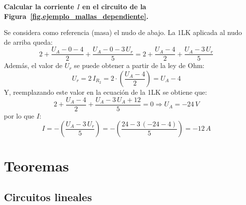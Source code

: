 	\begin{example}\label{ex.nudos_mod_fdep}
	    \textbf{Calcular la corriente $I$ en el circuito de la Figura~\ref{fig.ejemplo_mallas_dependiente}.}
	    
	    Se considera como referencia (masa) el nudo de abajo. La 1LK aplicada al nudo de arriba queda: 
	    \begin{equation*}
	        2+\dfrac{U_A-0-4}{2}+\dfrac{U_A-0-3\,U_r}{5}=2+\dfrac{U_A-4}{2}+\dfrac{U_A-3\,U_r}{5}
	    \end{equation*}
	    Además, el valor de $U_r$ se puede obtener a partir de la ley de Ohm:
	    \begin{equation*}
	        U_r=2\, I_{R_2}=2\cdot \left( \dfrac{U_A-4}{2} \right)=U_A-4
	    \end{equation*}
	    Y, reemplazando este valor en la ecuación de la 1LK se obtiene que: 
	    \begin{equation*}
	        2+\dfrac{U_A-4}{2}+\dfrac{U_A-3\,U_A+12}{5}=0\Rightarrow U_A=-24\,V
	    \end{equation*}
	    por lo que $I$:
	    \begin{equation*}
	        I=-\left(\dfrac{U_A-3\,U_r}{5} \right)=-\left(\dfrac{24-3\,(-24-4)}{5}\right)=-12\,A
	    \end{equation*}
	\end{example}
	
	\section{Teoremas}\label{sec.teoremas_CC}
	
	\subsection{Circuitos lineales}
	
